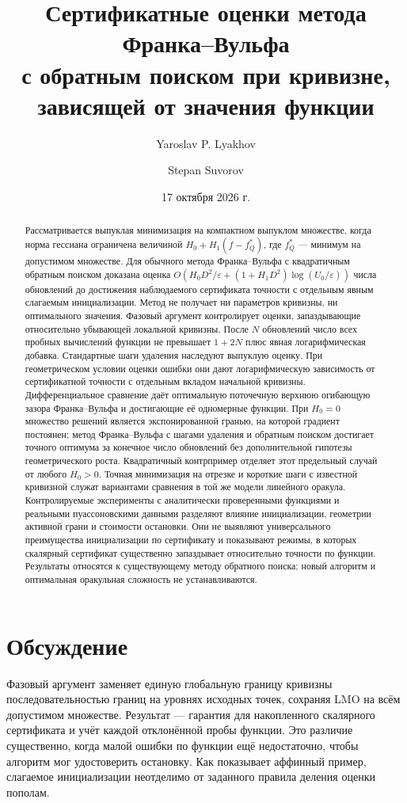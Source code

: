 \documentclass[a4paper,11pt]{article}
\title{Сертификатные оценки метода Франка–Вульфа\\с обратным поиском при кривизне,\\зависящей от значения функции}
\author{Yaroslav P. Lyakhov \and Stepan Suvorov}
\date{17 октября 2026 г.}
\begin{document}
\maketitle
\begin{abstract}
Рассматривается выпуклая минимизация на компактном выпуклом множестве,
когда норма гессиана ограничена величиной $H_0+H_1(f-f_Q^*)$, где
$f_Q^*$ — минимум на допустимом множестве. Для обычного метода
Франка–Вульфа с квадратичным обратным поиском доказана оценка
$O(H_0D^2/\varepsilon+(1+H_1D^2)\log(U_0/\varepsilon))$ числа
обновлений до достижения наблюдаемого сертификата точности с отдельным
явным слагаемым инициализации. Метод не получает ни параметров кривизны,
ни оптимального значения. Фазовый аргумент контролирует оценки,
запаздывающие относительно убывающей локальной кривизны. После $N$
обновлений число всех пробных вычислений функции не превышает $1+2N$
плюс явная логарифмическая добавка. Стандартные шаги удаления наследуют
выпуклую оценку. При геометрическом условии оценки ошибки они дают
логарифмическую зависимость от сертификатной точности с отдельным вкладом
начальной кривизны. Дифференциальное сравнение даёт оптимальную поточечную
верхнюю огибающую зазора Франка–Вульфа и достигающие её одномерные
функции. При $H_0=0$ множество решений является экспонированной гранью,
на которой градиент постоянен; метод Франка–Вульфа с шагами удаления и
обратным поиском достигает точного оптимума за конечное число обновлений
без дополнительной гипотезы геометрического роста. Квадратичный
контрпример отделяет этот предельный случай от любого $H_0>0$.
Точная минимизация на отрезке и короткие шаги с известной кривизной
служат вариантами сравнения в той же модели линейного оракула.
Контролируемые эксперименты с аналитически проверенными функциями и
реальными пуассоновскими данными разделяют влияние инициализации,
геометрии активной грани и стоимости остановки. Они не выявляют
универсального преимущества инициализации по сертификату и показывают
режимы, в которых скалярный сертификат существенно запаздывает
относительно точности по функции. Результаты относятся к существующему
методу обратного поиска; новый алгоритм и оптимальная оракульная
сложность не устанавливаются.
\end{abstract}





\section{Обсуждение}
Фазовый аргумент заменяет единую глобальную границу кривизны
последовательностью границ на уровнях исходных точек, сохраняя LMO на
всём допустимом множестве. Результат — гарантия для накопленного
скалярного сертификата и учёт каждой отклонённой пробы функции.
Это различие существенно, когда малой ошибки по функции ещё
недостаточно, чтобы алгоритм мог удостоверить остановку. Как показывает
аффинный пример, слагаемое инициализации неотделимо от заданного
правила деления оценки пополам.
\end{document}
